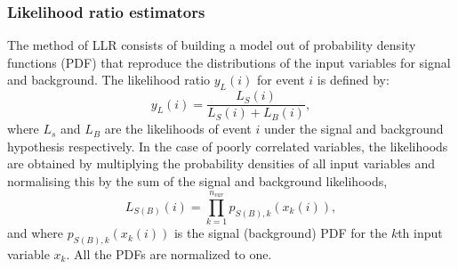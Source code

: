 \subsubsection{Likelihood ratio estimators}

The method of LLR consists of building a model out of probability density functions (PDF) that reproduce the distributions of the input variables for signal and background. 
The likelihood ratio $y_{L}(i)$ for event $i$ is defined by:
%
\begin{equation}
y_{L}(i) = \frac{L_S(i)}{L_S(i)+L_B(i)},
\end{equation}
%
where $L_s$ and $L_B$ are the likelihoods of event $i$ under the signal and background hypothesis respectively.
In the case of poorly correlated variables, the likelihoods  %
are obtained by multiplying the probability densities of all input variables and normalising this by the sum of the signal and background likelihoods, %
%
\begin{equation}
L_{S(B)}(i) = \prod^{n_{var}}_{k=1}  p_{S(B),k}(x_k(i)),
\end{equation}
%
and where $p_{S(B),k}(x_k(i))$ is the signal (background) PDF for the $k$th input variable $x_k$. All the PDFs are normalized to one. 

